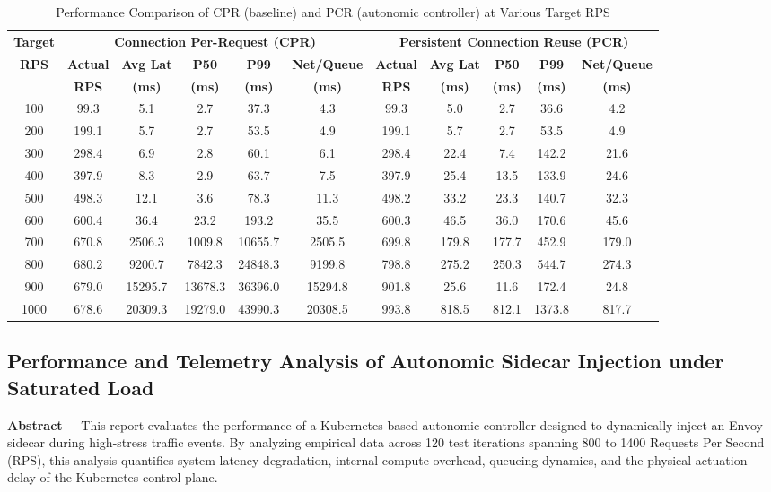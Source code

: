 \documentclass{article}
\begin{document}
\begin{landscape}
\begin{table}[h]
\centering
\caption{Performance Comparison of CPR (baseline) and PCR (autonomic controller) at Various Target RPS}
\label{tab:performance_comparison}
\small
\begin{tabular}{c|ccccc|ccccc}
\toprule
\textbf{Target} & \multicolumn{5}{c|}{\textbf{Connection Per-Request (CPR)}} & \multicolumn{5}{c}{\textbf{Persistent Connection Reuse (PCR)}} \\
\textbf{RPS} & \textbf{Actual} & \textbf{Avg Lat} & \textbf{P50} & \textbf{P99} & \textbf{Net/Queue} & \textbf{Actual} & \textbf{Avg Lat} & \textbf{P50} & \textbf{P99} & \textbf{Net/Queue} \\
& \textbf{RPS} & \textbf{(ms)} & \textbf{(ms)} & \textbf{(ms)} & \textbf{(ms)} & \textbf{RPS} & \textbf{(ms)} & \textbf{(ms)} & \textbf{(ms)} & \textbf{(ms)} \\
\midrule
100 & 99.3 & 5.1 & 2.7 & 37.3 & 4.3 & 99.3 & 5.0 & 2.7 & 36.6 & 4.2 \\
200 & 199.1 & 5.7 & 2.7 & 53.5 & 4.9 & 199.1 & 5.7 & 2.7 & 53.5 & 4.9 \\
300 & 298.4 & 6.9 & 2.8 & 60.1 & 6.1 & 298.4 & 22.4 & 7.4 & 142.2 & 21.6 \\
400 & 397.9 & 8.3 & 2.9 & 63.7 & 7.5 & 397.9 & 25.4 & 13.5 & 133.9 & 24.6 \\
500 & 498.3 & 12.1 & 3.6 & 78.3 & 11.3 & 498.2 & 33.2 & 23.3 & 140.7 & 32.3 \\
600 & 600.4 & 36.4 & 23.2 & 193.2 & 35.5 & 600.3 & 46.5 & 36.0 & 170.6 & 45.6 \\
700 & 670.8 & 2506.3 & 1009.8 & 10655.7 & 2505.5 & 699.8 & 179.8 & 177.7 & 452.9 & 179.0 \\
800 & 680.2 & 9200.7 & 7842.3 & 24848.3 & 9199.8 & 798.8 & 275.2 & 250.3 & 544.7 & 274.3 \\
900 & 679.0 & 15295.7 & 13678.3 & 36396.0 & 15294.8 & 901.8 & 25.6 & 11.6 & 172.4 & 24.8 \\
1000 & 678.6 & 20309.3 & 19279.0 & 43990.3 & 20308.5 & 993.8 & 818.5 & 812.1 & 1373.8 & 817.7 \\
\bottomrule
\end{tabular}
\end{table}
\end{landscape}

\subsection{Performance and Telemetry Analysis of Autonomic Sidecar Injection under Saturated Load}
\textbf{Abstract— }This report evaluates the performance of a Kubernetes-based autonomic controller designed to dynamically inject an Envoy sidecar during high-stress traffic events. By analyzing empirical data across 120 test iterations spanning 800 to 1400 Requests Per Second (RPS), this analysis quantifies system latency degradation, internal compute overhead, queueing dynamics, and the physical actuation delay of the Kubernetes control plane.
\end{document}
